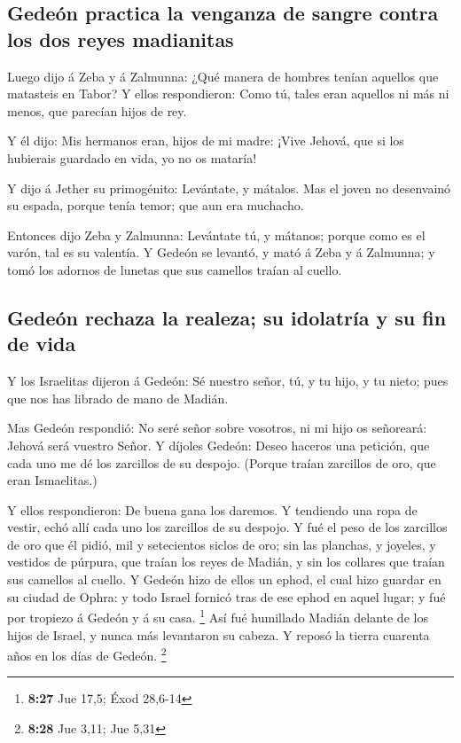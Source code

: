 \hypertarget{gedeuxf3n-practica-la-venganza-de-sangre-contra-los-dos-reyes-madianitas}{%
\subsection{Gedeón practica la venganza de sangre contra los dos reyes
madianitas}\label{gedeuxf3n-practica-la-venganza-de-sangre-contra-los-dos-reyes-madianitas}}

 Luego dijo á Zeba y á Zalmunna: ¿Qué manera de hombres
tenían aquellos que matasteis en Tabor? Y ellos respondieron: Como tú,
tales eran aquellos ni más ni menos, que parecían hijos de rey.

 Y él dijo: Mis hermanos eran, hijos de mi madre: ¡Vive
Jehová, que si los hubierais guardado en vida, yo no os mataría!

 Y dijo á Jether su primogénito: Levántate, y mátalos.
Mas el joven no desenvainó su espada, porque tenía temor; que aun era
muchacho.

 Entonces dijo Zeba y Zalmunna: Levántate tú, y mátanos;
porque como es el varón, tal es su valentía. Y Gedeón se levantó, y mató
á Zeba y á Zalmunna; y tomó los adornos de lunetas que sus camellos
traían al cuello.

\hypertarget{gedeuxf3n-rechaza-la-realeza-su-idolatruxeda-y-su-fin-de-vida}{%
\subsection{Gedeón rechaza la realeza; su idolatría y su fin de
vida}\label{gedeuxf3n-rechaza-la-realeza-su-idolatruxeda-y-su-fin-de-vida}}

 Y los Israelitas dijeron á Gedeón: Sé nuestro señor, tú,
y tu hijo, y tu nieto; pues que nos has librado de mano de Madián.

 Mas Gedeón respondió: No seré señor sobre vosotros, ni
mi hijo os señoreará: Jehová será vuestro Señor.  Y
díjoles Gedeón: Deseo haceros una petición, que cada uno me dé los
zarcillos de su despojo. (Porque traían zarcillos de oro, que eran
Ismaelitas.)

 Y ellos respondieron: De buena gana los daremos. Y
tendiendo una ropa de vestir, echó allí cada uno los zarcillos de su
despojo.  Y fué el peso de los zarcillos de oro que él
pidió, mil y setecientos siclos de oro; sin las planchas, y joyeles, y
vestidos de púrpura, que traían los reyes de Madián, y sin los collares
que traían sus camellos al cuello.  Y Gedeón hizo de
ellos un ephod, el cual hizo guardar en su ciudad de Ophra: y todo
Israel fornicó tras de ese ephod en aquel lugar; y fué por tropiezo á
Gedeón y á su casa. \footnote{\textbf{8:27} Jue 17,5; Éxod 28,6-14}
 Así fué humillado Madián delante de los hijos de Israel,
y nunca más levantaron su cabeza. Y reposó la tierra cuarenta años en
los días de Gedeón. \footnote{\textbf{8:28} Jue 3,11; Jue 5,31}

